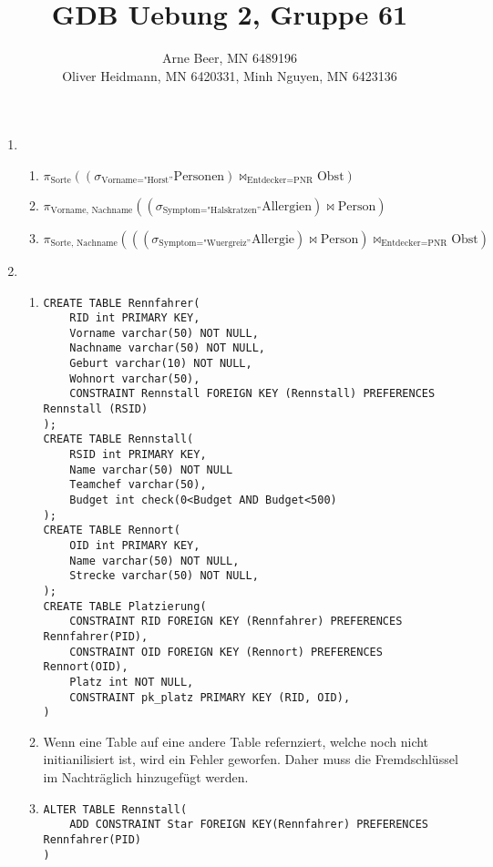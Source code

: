 \documentclass{article}
\title{GDB Uebung 2, Gruppe 61}
\author{Arne Beer, MN 6489196\\
        Oliver Heidmann, MN 6420331,
        Minh Nguyen, MN 6423136}
\begin{document}
    \maketitle
    \begin{enumerate}
        \item %
            \begin{enumerate}
                \item $ \pi_{\text{Sorte}}((\sigma_{\text{Vorname="Horst''}} \text{Personen})\bowtie_{\text{Entdecker=PNR}} \text{Obst})$ 
                \item $ \pi_{\text{Vorname, Nachname}}((\sigma_{\text{Symptom="Halskratzen''}}\text{Allergien})\bowtie \text{Person})$
                \item $ \pi_{\text{Sorte, Nachname}}(((\sigma_{\text{Symptom="Wuergreiz''}}\text{Allergie})\bowtie \text{Person})\bowtie_{\text{Entdecker=PNR}}\text{Obst})$
            \end{enumerate}
        \item 
            \begin{enumerate}
                \item %
                    \begin{verbatim}
CREATE TABLE Rennfahrer(
    RID int PRIMARY KEY,
    Vorname varchar(50) NOT NULL,
    Nachname varchar(50) NOT NULL,
    Geburt varchar(10) NOT NULL,
    Wohnort varchar(50),
    CONSTRAINT Rennstall FOREIGN KEY (Rennstall) PREFERENCES Rennstall (RSID)
);
CREATE TABLE Rennstall(
    RSID int PRIMARY KEY,
    Name varchar(50) NOT NULL
    Teamchef varchar(50),
    Budget int check(0<Budget AND Budget<500)
);
CREATE TABLE Rennort(
    OID int PRIMARY KEY,
    Name varchar(50) NOT NULL,
    Strecke varchar(50) NOT NULL,
);
CREATE TABLE Platzierung(
    CONSTRAINT RID FOREIGN KEY (Rennfahrer) PREFERENCES Rennfahrer(PID),
    CONSTRAINT OID FOREIGN KEY (Rennort) PREFERENCES Rennort(OID),
    Platz int NOT NULL,
    CONSTRAINT pk_platz PRIMARY KEY (RID, OID),
)
                    \end{verbatim}
                \item
                    Wenn eine Table auf eine andere Table refernziert, welche noch nicht initianilisiert ist, wird ein Fehler geworfen. Daher muss die Fremdschlüssel im Nachträglich hinzugefügt werden.
                \item
                    \begin{verbatim}
ALTER TABLE Rennstall(
    ADD CONSTRAINT Star FOREIGN KEY(Rennfahrer) PREFERENCES Rennfahrer(PID)
)


\end{verbatim}
\end{enumerate}
\end{enumerate}
\end{document}
